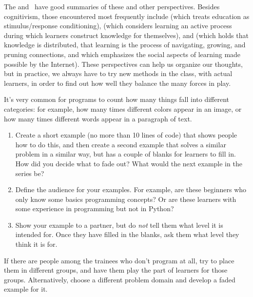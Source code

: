 The  and~\cite{Wibu2016}
have good summaries of these and other perspectives.
Besides cognitivism,
those encountered most frequently include 
(which treats education as stimulus/response conditioning),
(which considers learning an active process during which learners construct knowledge for themselves),
and 
(which holds that knowledge is distributed,
that learning is the process of navigating, growing, and pruning connections,
and which emphasizes the social aspects of learning made possible by the Internet).
These perspectives can help us organize our thoughts,
but in practice,
we always have to try new methods in the class,
with actual learners,
in order to find out how well they balance the many forces in play.



It's very common for programs to count how many things fall into
different categories: for example, how many times different colors
appear in an image, or how many times different words appear in a
paragraph of text.

\begin{enumerate}
\item
  Create a short example (no more than 10 lines of code) that shows
  people how to do this, and then create a second example that solves
  a similar problem in a similar way, but has a couple of blanks for
  learners to fill in. How did you decide what to fade out? What would
  the next example in the series be?
\item
  Define the audience for your examples. For example, are these
  beginners who only know some basics programming concepts? Or are
  these learners with some experience in programming but not in
  Python?
\item
  Show your example to a partner, but do \emph{not} tell them what level it
  is intended for. Once they have filled in the blanks, ask them what
  level they think it is for.
\end{enumerate}

If there are people among the trainees who don't program at all, try to
place them in different groups, and have them play the part of learners
for those groups. Alternatively, choose a different problem domain and
develop a faded example for it.


